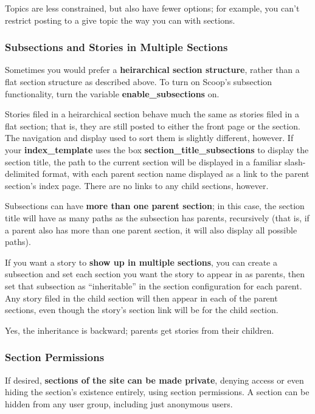 Topics are less constrained, but also have fewer options; for example, you can't restrict posting to a give topic the way you can with sections.

\subsubsection{Subsections and Stories in Multiple Sections}
\label{sections-subsections}

Sometimes you would prefer a {\bf heirarchical section structure}, rather than a flat section structure as described above.  To turn on Scoop's subsection functionality, turn the variable {\bf enable\_subsections} on.

Stories filed in a heirarchical section behave much the same as stories filed in a flat section; that is, they are still posted to either the front page or the section.  The navigation and display used to sort them is slightly different, however.  If your {\bf index\_template} uses the box {\bf section\_title\_subsections} to display the section title, the path to the current section will be displayed in a familiar slash-delimited format, with each parent section name displayed as a link to the parent section's index page.  There are no links to any child sections, however.

Subsections can have {\bf more than one parent section}; in this case, the section title will have as many paths as the subsection has parents, recursively (that is, if a parent also has more than one parent section, it will also display all possible paths).

If you want a story to {\bf show up in multiple sections}, you can create a subsection and set each section you want the story to appear in as parents, then set that subsection as ``inheritable'' in the section configuration for each parent.  Any story filed in the child section will then appear in each of the parent sections, even though the story's section link will be for the child section.  

Yes, the inheritance is backward; parents get stories from their children.

\subsubsection{Section Permissions}
\label{sections-perms}

If desired, {\bf sections of the site can be made private}, denying access or even hiding the section's existence entirely, using section permissions.  A section can be hidden from any user group, including just anonymous users.  

